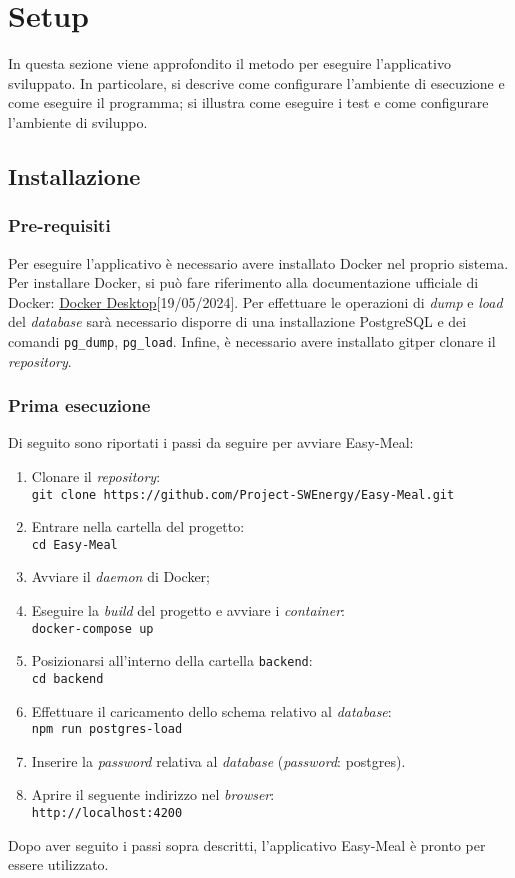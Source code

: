 \section{Setup}
In questa sezione viene approfondito il metodo per eseguire l'applicativo sviluppato. 
In particolare, si descrive come configurare l'ambiente di
esecuzione e come eseguire il programma; si illustra come eseguire i test e come
configurare l'ambiente di sviluppo.


\subsection{Installazione}


\subsubsection{Pre-requisiti}
Per eseguire l'applicativo è necessario avere installato Docker nel proprio
sistema. Per installare Docker, si può fare riferimento alla documentazione
ufficiale di Docker:
\href{https://www.docker.com/products/docker-desktop/}{Docker Desktop}[19/05/2024].
Per effettuare le operazioni di \textit{dump} e \textit{load} del \textit{database} sarà necessario disporre di una installazione PostgreSQL e dei comandi \texttt{pg\_dump}, \texttt{pg\_load}.
Infine, è necessario avere installato git\g per clonare il \textit{repository}.


\subsubsection{Prima esecuzione}
Di seguito sono riportati i passi da seguire per avviare Easy-Meal:
\begin{enumerate}
	\item Clonare il \textit{repository}\g: \\
		\texttt{git clone https://github.com/Project-SWEnergy/Easy-Meal.git}
	\item Entrare nella cartella del progetto: \\
		\texttt{cd Easy-Meal}
	\item Avviare il \textit{daemon} di Docker;
	\item Eseguire la \textit{build} del progetto e avviare i \textit{container}: \\
		\texttt{docker-compose up}
	\item Posizionarsi all'interno della cartella \texttt{backend}:\\
		\texttt{cd backend}
	\item Effettuare il caricamento dello schema relativo al \textit{database}:\\
		\texttt{npm run postgres-load}
	\item Inserire la \textit{password} relativa al \textit{database} (\textit{password}:
		postgres).
	\item Aprire il seguente indirizzo nel \textit{browser}: \\ 
		\texttt{http://localhost:4200}
\end{enumerate}
Dopo aver seguito i passi sopra descritti, l'applicativo Easy-Meal è pronto per essere utilizzato. 


